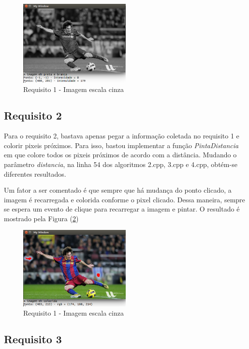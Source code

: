 \begin{figure}[!ht]
\centering
\label{fig:re1gray}
\caption{Requisito 1 - Imagem escala cinza}
\includegraphics[width=0.5\textwidth]{img/T1_grayscale.png}
\end{figure}

\subsection{Requisito 2}

Para o requisito 2, bastava apenas pegar a informação coletada no requisito 1 e colorir pixeis próximos.
Para isso, bastou implementar a função \textit{PintaDistancia} em que colore todos os pixeis próximos de acordo com a distância. Mudando o parâmetro \textit{distancia}, na linha 54 dos algoritmos 2.cpp, 3.cpp e 4.cpp, obtém-se diferentes resultados.

Um fator a ser comentado é que sempre que há mudança do ponto clicado, a imagem é recarregada e colorida conforme o pixel clicado. Dessa maneira, sempre se espera um evento de clique para recarregar a imagem e pintar. O resultado é mostrado pela Figura (\ref{fig:re2colored})

\begin{figure}[!ht]
\centering
\label{fig:re2colored}
\caption{Requisito 1 - Imagem escala cinza}
\includegraphics[width=0.5\textwidth]{img/T2_colored.png}
\end{figure}

\subsection{Requisito 3}

